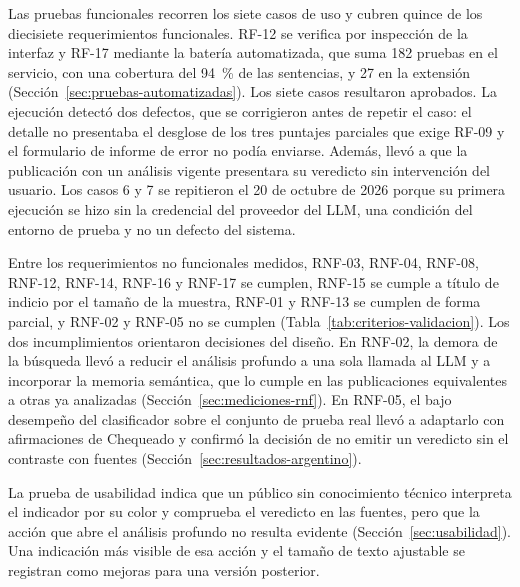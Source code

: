 Las pruebas funcionales recorren los siete casos de uso y cubren quince de los diecisiete requerimientos funcionales. RF-12 se verifica por inspección de la interfaz y RF-17 mediante la batería automatizada, que suma 182 pruebas en el servicio, con una cobertura del 94~\% de las sentencias, y 27 en la extensión (Sección~\ref{sec:pruebas-automatizadas}). Los siete casos resultaron aprobados. La ejecución detectó dos defectos, que se corrigieron antes de repetir el caso: el detalle no presentaba el desglose de los tres puntajes parciales que exige RF-09 y el formulario de informe de error no podía enviarse. Además, llevó a que la publicación con un análisis vigente presentara su veredicto sin intervención del usuario. Los casos 6 y 7 se repitieron el 20 de octubre de 2026 porque su primera ejecución se hizo sin la credencial del proveedor del LLM, una condición del entorno de prueba y no un defecto del sistema.

Entre los requerimientos no funcionales medidos, RNF-03, RNF-04, RNF-08, RNF-12, RNF-14, RNF-16 y RNF-17 se cumplen, RNF-15 se cumple a título de indicio por el tamaño de la muestra, RNF-01 y RNF-13 se cumplen de forma parcial, y RNF-02 y RNF-05 no se cumplen (Tabla~\ref{tab:criterios-validacion}). Los dos incumplimientos orientaron decisiones del diseño. En RNF-02, la demora de la búsqueda llevó a reducir el análisis profundo a una sola llamada al LLM y a incorporar la memoria semántica, que lo cumple en las publicaciones equivalentes a otras ya analizadas (Sección~\ref{sec:mediciones-rnf}). En RNF-05, el bajo desempeño del clasificador sobre el conjunto de prueba real llevó a adaptarlo con afirmaciones de Chequeado y confirmó la decisión de no emitir un veredicto sin el contraste con fuentes (Sección~\ref{sec:resultados-argentino}).

La prueba de usabilidad indica que un público sin conocimiento técnico interpreta el indicador por su color y comprueba el veredicto en las fuentes, pero que la acción que abre el análisis profundo no resulta evidente (Sección~\ref{sec:usabilidad}). Una indicación más visible de esa acción y el tamaño de texto ajustable se registran como mejoras para una versión posterior.
